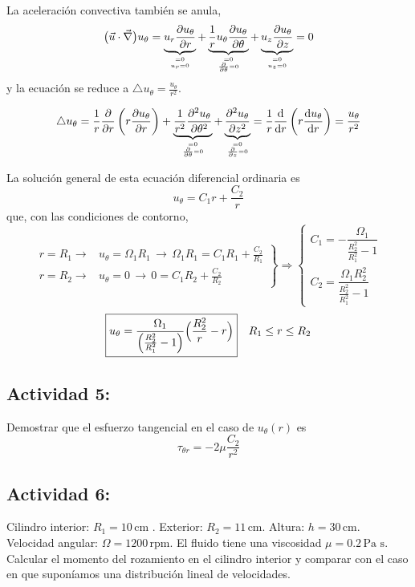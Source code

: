 	La aceleración convectiva también se anula, 
	\[
	\bigl(\vec{u}\cdot\vec{\nabla}\bigr)u_{\theta}=\underbrace{u_{r}\dparc{u_{\theta}}{r}}_{\binom{=0}{u_{r}=0}}+\underbrace{\frac{1}{r}u_{\theta}\dparc{u_{\theta}}{\theta}}_{\binom{=0}{\dparc{}{\theta}=0}}+\underbrace{u_{z}\dparc{u_{\theta}}{z}}_{\binom{=0}{u_{z}=0}}=0
	\]
	y la ecuación se reduce a $\triangle u_{\theta}=\frac{u_{\theta}}{r^{2}}$.
	
	\[
	\triangle u_{\theta}=\frac{1}{r}\dparc{}{r}\left(r\dparc{u_{\theta}}{r}\right)+\underbrace{\frac{1}{r^{2}}\dparcsec{u_{\theta}}{\theta}}_{\binom{=0}{\dparc{}{\theta}=0}}+\underbrace{\dparcsec{u_{\theta}}{z}}_{\binom{=0}{\dparc{}{z}=0}}=\frac{1}{r}\deriv{}{r}\left(r\deriv{u_{\theta}}{r}\right)=\frac{u_{\theta}}{r^{2}}
	\]
	
	La solución general de esta ecuación diferencial ordinaria es 
	\[
	u_{\theta}=C_{1}r+\frac{C_{2}}{r}
	\]
	que, con las condiciones de contorno, {\small{}
		\[
		\left.\begin{array}{ll}
			r=R_{1}\rightarrow & u_{\theta}=\Omega_{1}R_{1}\,\rightarrow\,\Omega_{1}R_{1}=C_{1}R_{1}+\frac{C_{2}}{R_{1}}\\
			r=R_{2}\rightarrow & u_{\theta}=0\,\rightarrow\,0=C_{1}R_{2}+\frac{C_{2}}{R_{2}}
		\end{array}\right\} \Rightarrow\left\{ \begin{array}{l}
			C_{1}=-\dfrac{\Omega_{1}}{\frac{R_{2}^{2}}{R_{1}^{2}}-1}\\
			C_{2}=\dfrac{\Omega_{1}R_{2}^{2}}{\frac{R_{2}^{2}}{R_{1}^{2}}-1}
		\end{array}\right.
		\]
	} 
	\[
	\boxed{u_{\theta}=\frac{\Omega_{1}}{\Bigl(\frac{R_{2}^{2}}{R_{1}^{2}}-1\Bigr)}\Bigl(\frac{R_{2}^{2}}{r}-r\Bigr)}\quad R_{1}\leq r\leq R_{2}
	\]

	
	\subsection*{Actividad 5:}
		Demostrar que el esfuerzo tangencial en el caso de $u_{\theta}(r)$
		es 
		\[
		\tau_{\theta r}=-2\mu\frac{C_{2}}{r^{2}}
		\]

	
	\subsection*{Actividad 6:}
		Cilindro interior: $R_{1}=10\,\text{cm}$ . Exterior: $R_{2}=11\,\text{cm}$.
		Altura: $h=30\,\text{cm}$. Velocidad angular: $\Omega=1200\,\text{rpm}.$
		El fluido tiene una viscosidad $\mu=0.2\,\text{Pa s}$. Calcular el
		momento del rozamiento en el cilindro interior y comparar con el caso
		en que suponíamos una distribución lineal de velocidades.

	
